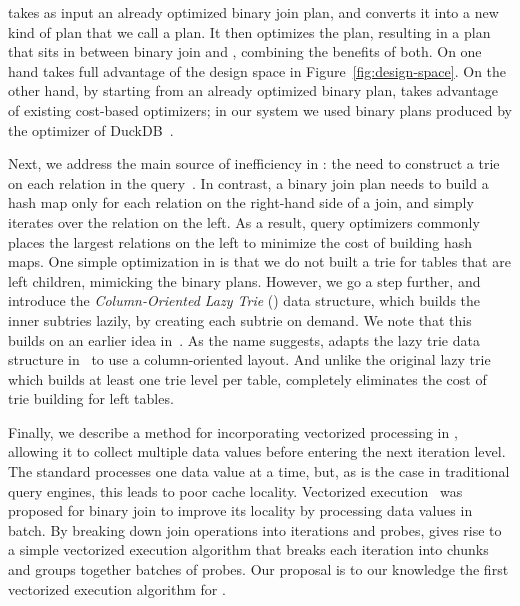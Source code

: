   \FJ takes as input an already optimized binary join plan, and
  converts it into a new kind of plan that we call a \FJ plan.  It
  then optimizes the \FJ plan, resulting in a plan that sits in
  between binary join and \GJ, combining the benefits of both.  On one
  hand \FJ takes full advantage of the design space in
  Figure~\ref{fig:design-space}.  On the other hand, by starting from
  an already optimized binary plan, \FJ takes advantage of existing
  cost-based optimizers; in our system we used binary plans produced by
  the optimizer of DuckDB~\cite{DBLP:conf/cidr/RaasveldtM20,DBLP:conf/vldb/Raasveldt22}.

Next, we address the main source of
  inefficiency in \GJ: the need to construct a trie on each relation
  in the query~\cite{DBLP:journals/pvldb/MhedhbiS19,DBLP:journals/pvldb/FreitagBSKN20}.  
In contrast,  a binary join plan needs to build a hash map only for each relation 
  on the right-hand side of a join,
  and simply iterates over the relation on the left.
As a result, query optimizers commonly places the largest relations on the left
 to minimize the cost of building hash maps.
One simple optimization in \FJ is that we do not built a trie for
tables that are left children, mimicking the binary plans.
%
However, we go a step further, and introduce the {\em Column-Oriented
  Lazy Trie} (\COLT) data structure, which builds the inner subtries
  lazily, by creating each subtrie on demand.  
We note that this builds on an earlier idea
in~\cite{DBLP:journals/pvldb/FreitagBSKN20}.  As the name suggests,
\COLT adapts the lazy trie data structure
in~\cite{DBLP:journals/pvldb/FreitagBSKN20} to use a column-oriented
layout.  And unlike the original lazy trie which builds at least one
trie level per table, \COLT completely eliminates the cost of trie
building for left tables.


Finally, we describe a method for incorporating vectorized
  processing in \FJ, allowing it to collect multiple data values
  before entering the next iteration level.  
The standard \GJ processes one data value at a time, but, as is the
  case in traditional query engines, this leads to poor cache
  locality.  
Vectorized execution~\cite{DBLP:conf/icde/PadmanabhanAMJ01} was proposed for binary join
  to improve its locality by processing data values in batch.
By breaking down join operations into iterations and probes, 
  \FJ gives rise to a simple vectorized execution algorithm
  that breaks each iteration into chunks and groups together 
  batches of probes.
Our proposal is to our knowledge the first vectorized execution algorithm for \GJ.


